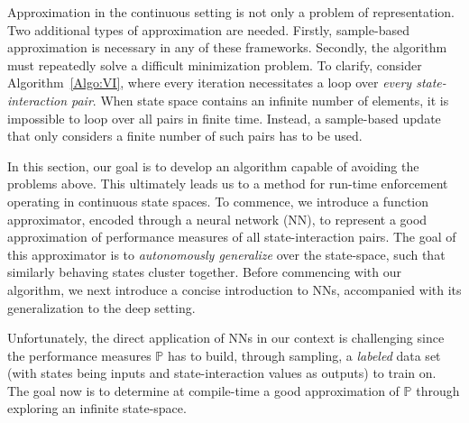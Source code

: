 Approximation in the continuous setting is not only a problem of representation. Two additional types of approximation are needed. Firstly, sample-based approximation is necessary in any of these frameworks. Secondly, the algorithm must repeatedly solve a difficult minimization problem. To clarify, consider Algorithm~\ref{Algo:VI}, where every iteration necessitates a loop over \emph{every state-interaction pair}. When state space contains an infinite number of elements, it is impossible to loop over all pairs in finite time. Instead, a sample-based update that only considers a finite number of such pairs has to be used. 

In this section, our goal is to develop an algorithm capable of avoiding the problems above. This ultimately leads us to a method for run-time enforcement operating in continuous state spaces. 
To commence, we introduce a function approximator, encoded through a neural network (NN), to represent a
good approximation of performance measures of all state-interaction pairs. The goal of this approximator is to \emph{autonomously generalize} over the state-space, such that similarly behaving states cluster together. Before commencing with our algorithm, we next introduce a concise introduction to NNs, accompanied with its generalization to the deep setting. 

 

Unfortunately, the direct application of NNs in our context is challenging since the performance measures $\mathbb{P}$ has to build, through sampling, a \emph{labeled} data set (with states being inputs and state-interaction values as outputs) to train on. The goal now is to determine at compile-time a good approximation of $\mathbb{P}$ through exploring an infinite state-space. 

